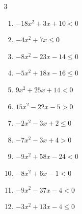 \begin{multicols}{3}
\begin{enumerate}

  \item $-18x^{2}+3x+10<0$


  \item $-4x^{2}+7x\leq 0$


  \item $-8x^{2}-23x-14\leq 0$


  \item $-5x^{2}+18x-16\leq 0$


  \item $9x^{2}+25x+14<0$


  \item $15x^{2}-22x-5>0$


  \item $-2x^{2}-3x+2\leq 0$


  \item $-7x^{2}-3x+4>0$


  \item $-9x^{2}+58x-24<0$


\columnbreak %

\resetques

  \item $-8x^{2}+6x-1<0$


  \item $-9x^{2}-37x-4<0$


  \item $-3x^{2}+13x-4\leq 0$


\end{enumerate}
\end{multicols}
